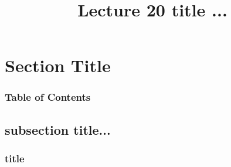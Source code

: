\documentclass[xcolor=dvipsnames]{beamer}
\begin{document}
	\title[Lecture 20]{Lecture 20 title ...}
	\author[]{\className}
	\institute[\className]{\departmentName}
	\date{} 


	\begin{frame}
		\maketitle
	\end{frame}


\section{Section Title} 

	\begin{frame} \frametitle{Table of Contents}
		\tableofcontents[currentsection]
	\end{frame} 
	
	
	\subsection{subsection title...}
	
		\begin{frame} \frametitle{title}
	
		\end{frame}
\end{document}
